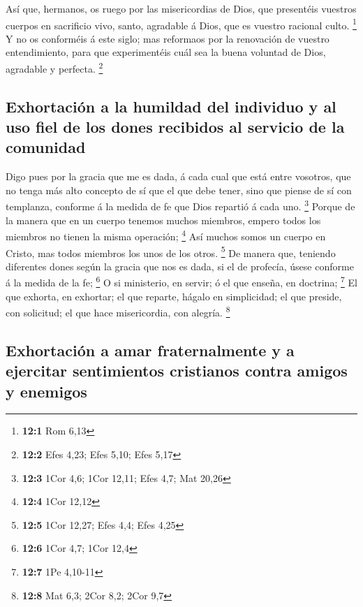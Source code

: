  Así que, hermanos, os ruego por las misericordias de Dios,
que presentéis vuestros cuerpos en sacrificio vivo, santo, agradable á
Dios, que es vuestro racional culto. \footnote{\textbf{12:1} Rom 6,13}
 Y no os conforméis á este siglo; mas reformaos por la
renovación de vuestro entendimiento, para que experimentéis cuál sea la
buena voluntad de Dios, agradable y perfecta. \footnote{\textbf{12:2}
  Efes 4,23; Efes 5,10; Efes 5,17}

\hypertarget{exhortaciuxf3n-a-la-humildad-del-individuo-y-al-uso-fiel-de-los-dones-recibidos-al-servicio-de-la-comunidad}{%
\subsection{Exhortación a la humildad del individuo y al uso fiel de los
dones recibidos al servicio de la
comunidad}\label{exhortaciuxf3n-a-la-humildad-del-individuo-y-al-uso-fiel-de-los-dones-recibidos-al-servicio-de-la-comunidad}}

 Digo pues por la gracia que me es dada, á cada cual que
está entre vosotros, que no tenga más alto concepto de sí que el que
debe tener, sino que piense de sí con templanza, conforme á la medida de
fe que Dios repartió á cada uno. \footnote{\textbf{12:3} 1Cor 4,6; 1Cor
  12,11; Efes 4,7; Mat 20,26}  Porque de la manera que en un
cuerpo tenemos muchos miembros, empero todos los miembros no tienen la
misma operación; \footnote{\textbf{12:4} 1Cor 12,12}  Así
muchos somos un cuerpo en Cristo, mas todos miembros los unos de los
otros. \footnote{\textbf{12:5} 1Cor 12,27; Efes 4,4; Efes 4,25}
 De manera que, teniendo diferentes dones según la gracia
que nos es dada, si el de profecía, úsese conforme á la medida de la fe;
\footnote{\textbf{12:6} 1Cor 4,7; 1Cor 12,4}  O si
ministerio, en servir; ó el que enseña, en doctrina; \footnote{\textbf{12:7}
  1Pe 4,10-11}  El que exhorta, en exhortar; el que reparte,
hágalo en simplicidad; el que preside, con solicitud; el que hace
misericordia, con alegría. \footnote{\textbf{12:8} Mat 6,3; 2Cor 8,2;
  2Cor 9,7}

\hypertarget{exhortaciuxf3n-a-amar-fraternalmente-y-a-ejercitar-sentimientos-cristianos-contra-amigos-y-enemigos}{%
\subsection{Exhortación a amar fraternalmente y a ejercitar sentimientos
cristianos contra amigos y
enemigos}\label{exhortaciuxf3n-a-amar-fraternalmente-y-a-ejercitar-sentimientos-cristianos-contra-amigos-y-enemigos}}

